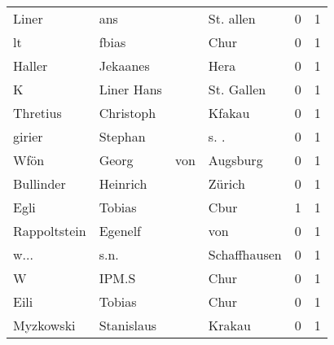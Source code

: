 \documentclass[10pt,a4paper,landscape]{article}
\begin{document}
\begin{longtable}{llllrr}
                    Liner &                                ans &             &                                   St. allen &          0 &         1 \\
                       lt &                              fbias &             &                                        Chur &          0 &         1 \\
                   Haller &                           Jekaanes &             &                                        Hera &          0 &         1 \\
                        K &                         Liner Hans &             &                                  St. Gallen &          0 &         1 \\
                 Thretius &                          Christoph &             &                                      Kfakau &          0 &         1 \\
                   girier &                            Stephan &             &                                       s. .  &          0 &         1 \\
                     Wfön &                              Georg &         von &                                    Augsburg &          0 &         1 \\
                Bullinder &                           Heinrich &             &                                      Zürich &          0 &         1 \\
                     Egli &                             Tobias &             &                                        Cbur &          1 &         1 \\
             Rappoltstein &                            Egenelf &             &                                         von &          0 &         1 \\
                     w... &                               s.n. &             &                                Schaffhausen &          0 &         1 \\
                        W &                              IPM.S &             &                                        Chur &          0 &         1 \\
                     Eili &                             Tobias &             &                                        Chur &          0 &         1 \\
                Myzkowski &                         Stanislaus &             &                                      Krakau &          0 &         1 \\

\end{longtable}
\end{document}
